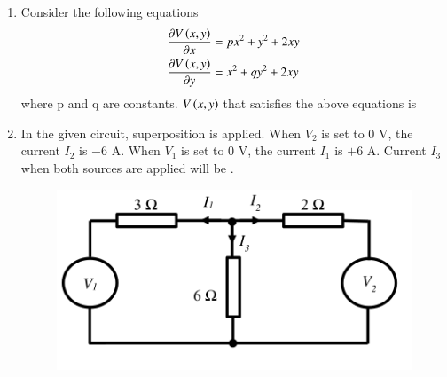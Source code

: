 \documentclass[journal,12pt,onecolumn]{IEEEtran}
\theoremstyle{remark}
\begin{document}
\begin{enumerate}
    \hfill{}
    \begin{enumerate}
    \end{enumerate}

    \item Consider the following equations
    \begin{align*}
     \frac{\partial V\left(x,y\right)}{\partial x}&=px^{2}+y^{2}+2xy \\
     \frac{\partial V\left(x,y\right)}{\partial y}&=x^{2}+qy^{2}+2xy 
    \end{align*}
    where p and q are constants. $V\left(x,y\right)$ that satisfies the above equations is
    
    \hfill{}
    \begin{enumerate}
    \end{enumerate}
    
    \item In the given circuit, superposition is applied. When $V_{2}$ is set to $0$ V, the current $I_{2}$ is $-6$ A. When $V_{1}$ is set to $0$ V, the current $I_{1}$ is $+6$ A. Current $I_3$  when both sources are applied will be  \underline{\hspace{2cm}}.
    \begin{figure}[H]
        \centering
        \includegraphics[width=0.6\columnwidth]{q30.png}
        \caption*{}
        \label{fig:q30}
    \end{figure}
    

\end{enumerate}
\end{document}
